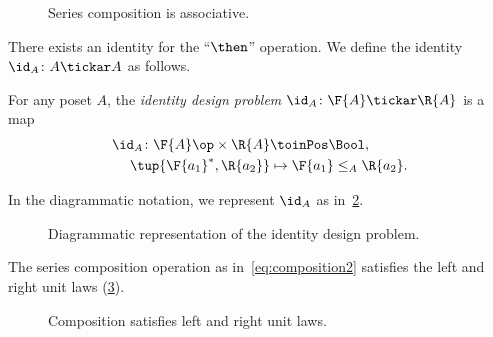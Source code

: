 \begin{figure}[h!]
\begin{center}
\end{center}
\caption{Series composition is associative. \label{fig:compositionassociativity}}
\end{figure}

There exists an identity for the ``$\then$'' operation.
We define the identity $\id_A\colon A \tickar A$ as follows.

\begin{definition}
\label{def:dp-identity}
For any poset $A$, the \emph{identity design problem} $\id_A\colon \F{A} \tickar \R{A}$ is a map
\begin{equation}
\begin{aligned}
  \id_A \colon \F{A}\op \times \R{A} & \toinPos   \Bool, \label{eq:identity}\\
  \tup{\F{a_1}^*, \R{a_2}} & \mapsto \F{a_1} \leq_{A} \R{a_2}.
\end{aligned}
\end{equation}
\end{definition}
\noindent In the diagrammatic notation, we represent $\id_A$ as in~\cref{fig:identitydp}.

\begin{figure}[h!]
    \begin{center}
\end{center}
\caption{Diagrammatic representation of the identity design problem. \label{fig:identitydp}}
\end{figure}

\begin{lemma}
    The series composition operation as in~\cref{eq:composition2} satisfies the left and right unit laws (\cref{fig:compositionunital}).
\begin{figure}[h!]
\begin{center}
\end{center}
\caption{Composition satisfies left and right unit laws. \label{fig:compositionunital}}
\end{figure}
\end{lemma}

